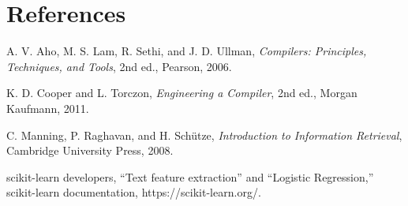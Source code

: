 \documentclass[12pt,a4paper]{article}
\begin{document}
\section*{References}
\begin{enumerate}[label={[}\arabic*{]}]
\item A. V. Aho, M. S. Lam, R. Sethi, and J. D. Ullman, \textit{Compilers: Principles, Techniques, and Tools}, 2nd ed., Pearson, 2006.
\item K. D. Cooper and L. Torczon, \textit{Engineering a Compiler}, 2nd ed., Morgan Kaufmann, 2011.
\item C. Manning, P. Raghavan, and H. Schütze, \textit{Introduction to Information Retrieval}, Cambridge University Press, 2008.
\item scikit-learn developers, ``Text feature extraction'' and ``Logistic Regression,'' scikit-learn documentation, https://scikit-learn.org/.
\end{enumerate}
\end{document}
